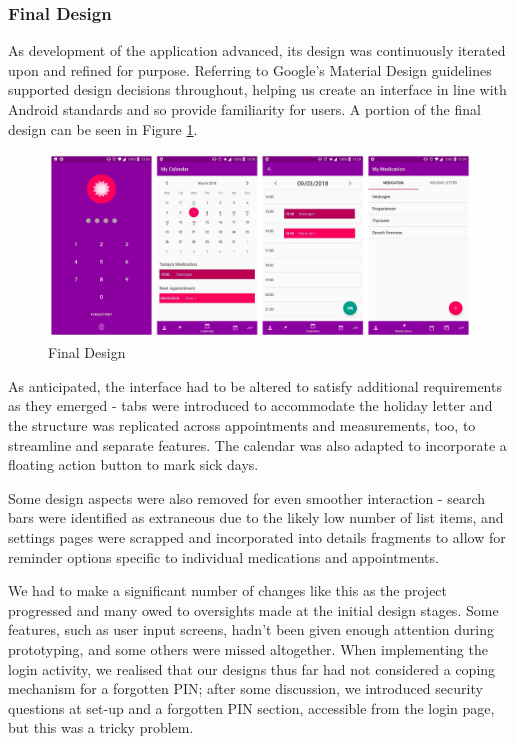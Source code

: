 \documentclass{l3proj}
\begin{document}
\subsubsection{Final Design} \label{sec:3.1.2}
As development of the application advanced, its design was continuously iterated upon and refined for purpose. Referring to Google’s Material Design guidelines \cite{material-design} supported design decisions throughout, helping us create an interface in line with Android standards and so provide familiarity for users. A portion of the final design can be seen in Figure \ref{fig:final_design}.

\begin{figure}[ht]
  \includegraphics[width=\linewidth]{figures/final_design.png}
  \caption{Final Design}
  \label{fig:final_design}
\end{figure}

As anticipated, the interface had to be altered to satisfy additional requirements as they emerged - tabs were introduced to accommodate the holiday letter and the structure was replicated across appointments and measurements, too, to streamline and separate features. The calendar was also adapted to incorporate a floating action button to mark sick days.

Some design aspects were also removed for even smoother interaction - search bars were identified as extraneous due to the likely low number of list items, and settings pages were scrapped and incorporated into details fragments to allow for reminder options specific to individual medications and appointments.

We had to make a significant number of changes like this as the project progressed and many owed to oversights made at the initial design stages. Some features, such as user input screens, hadn't been given enough attention during prototyping, and some others were missed altogether. When implementing the login activity, we realised that our designs thus far had not considered a coping mechanism for a forgotten PIN; after some discussion, we introduced security questions at set-up and a forgotten PIN section, accessible from the login page, but this was a tricky problem.
\end{document}
